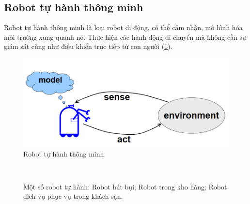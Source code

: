\subsection{Robot tự hành thông minh}
Robot tự hành thông minh là loại robot di động, có thể cảm nhận, mô hình hóa môi trường xung quanh nó. Thực hiện các hành động di chuyển mà không cần sự giám sát cũng như điều khiển trực tiếp từ con người (\figurename{\ref{fig:intro}}).

\begin{figure}
	\centering
	\includegraphics[width=13cm]{chapter1/figs/intro.png}
	\caption{Robot tự hành thông minh}
	\label{fig:intro}
\end{figure}

\begin{figure}
	\centering
	\hspace{8pt}
	\\
	\hspace{8pt}
	\caption[]{Một số robot tự hành: Robot hút bụi;  Robot trong kho hàng;  Robot dịch vụ phục vụ trong khách sạn.}
	\label{fig:ex3}
\end{figure}

